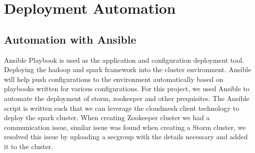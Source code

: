 \documentclass[9pt,twocolumn,twoside]{../../styles/osajnl}
\begin{document}
\begin{table}[htb]
\caption{TABLE CAPTION MISSING} 
\label{T:technologies}
\centering
{}
\end{table}








  
\section{Deployment Automation}
\subsection{Automation with Ansible}
Ansible Playbook is used as the application and configuration
deployment tool. Deploying the hadoop and spark framework into the
cluster environment. Ansible will help push configurations to the
environment automatically based on playbooks written for various
configurations. For this project, we used Ansible to automate the
deployment of storm, zookeeper and other prequisites. The Ansible
script is written such that we can leverage the cloudmesh client
technology to deploy the spark cluster. When creating Zookeeper
cluster we had a communication issue, similar issue was found when
creating a Storm cluster, we resolved this issue by uploading a
secgroup with the details necessary and added it to the cluster.
\end{document}
